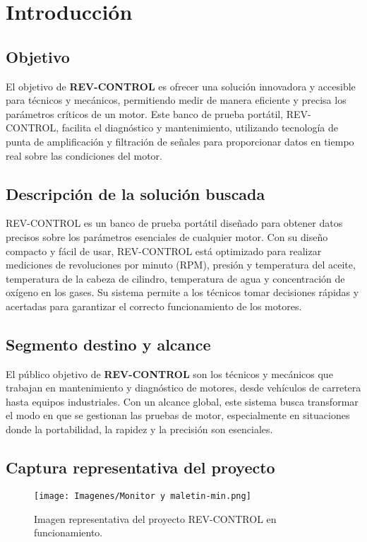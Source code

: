 \chapter{Introducción}

\section{Objetivo}  
El objetivo de \textbf{REV-CONTROL} es ofrecer una solución innovadora y accesible para técnicos y mecánicos, permitiendo medir de manera eficiente y precisa los parámetros críticos de un motor. Este banco de prueba portátil, REV-CONTROL, facilita el diagnóstico y mantenimiento, utilizando tecnología de punta de amplificación y filtración de señales para proporcionar datos en tiempo real sobre las condiciones del motor.

\section{Descripción de la solución buscada}  
REV-CONTROL es un banco de prueba portátil diseñado para obtener datos precisos sobre los parámetros esenciales de cualquier motor. Con su diseño compacto y fácil de usar, REV-CONTROL está optimizado para realizar mediciones de revoluciones por minuto (RPM), presión y temperatura del aceite, temperatura de la cabeza de cilindro, temperatura de agua y concentración de oxígeno en los gases. Su sistema permite a los técnicos tomar decisiones rápidas y acertadas para garantizar el correcto funcionamiento de los motores.

\section{Segmento destino y alcance}  
El público objetivo de \textbf{REV-CONTROL} son los técnicos y mecánicos que trabajan en mantenimiento y diagnóstico de motores, desde vehículos de carretera hasta equipos industriales. Con un alcance global, este sistema busca transformar el modo en que se gestionan las pruebas de motor, especialmente en situaciones donde la portabilidad, la rapidez y la precisión son esenciales.

\section{Captura representativa del proyecto}

\begin{figure}[H]
    \centering
    \texttt{[image: Imagenes/Monitor y maletin-min.png]}
    \caption{Imagen representativa del proyecto REV-CONTROL en funcionamiento.}
    \label{fig:representativa}
\end{figure}

